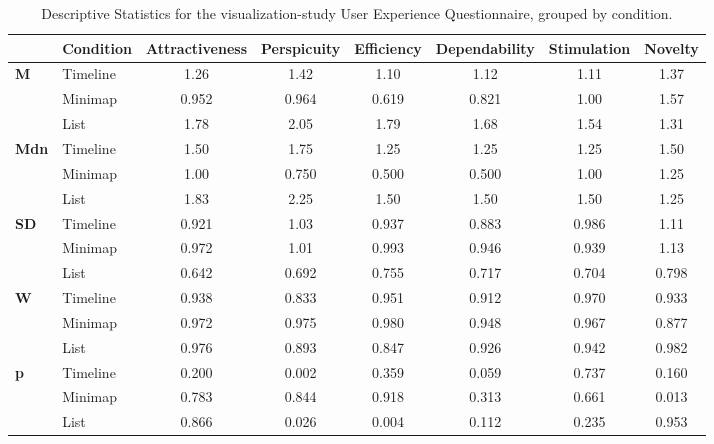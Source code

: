 \begin{table*}[ht]
    \centering
    \caption{Descriptive Statistics for the visualization-study User Experience Questionnaire, grouped by condition.}
    \begin{tabular}{llcccccc}
    \toprule
    \textbf{} & \textbf{Condition} & \textbf{Attractiveness} & \textbf{Perspicuity} & \textbf{Efficiency} & \textbf{Dependability} & \textbf{Stimulation} & \textbf{Novelty} \\
    \midrule
    \multirow{3}{*}{\textbf{M}} & Timeline & 1.26 & 1.42 & 1.10 & 1.12 & 1.11 & 1.37 \\
    & Minimap & 0.952 & 0.964 & 0.619 & 0.821 & 1.00 & 1.57 \\
    & List & 1.78 & 2.05 & 1.79 & 1.68 & 1.54 & 1.31 \\
    \midrule
    \multirow{3}{*}{\textbf{Mdn}} & Timeline & 1.50 & 1.75 & 1.25 & 1.25 & 1.25 & 1.50 \\
    & Minimap & 1.00 & 0.750 & 0.500 & 0.500 & 1.00 & 1.25 \\
    & List & 1.83 & 2.25 & 1.50 & 1.50 & 1.50 & 1.25 \\
    \midrule
    \multirow{3}{*}{\textbf{SD}} & Timeline & 0.921 & 1.03 & 0.937 & 0.883 & 0.986 & 1.11 \\
    & Minimap & 0.972 & 1.01 & 0.993 & 0.946 & 0.939 & 1.13 \\
    & List & 0.642 & 0.692 & 0.755 & 0.717 & 0.704 & 0.798 \\
    \midrule
    \multirow{3}{*}{\textbf{W}} & Timeline & 0.938 & 0.833 & 0.951 & 0.912 & 0.970 & 0.933 \\
    & Minimap & 0.972 & 0.975 & 0.980 & 0.948 & 0.967 & 0.877 \\
    & List & 0.976 & 0.893 & 0.847 & 0.926 & 0.942 & 0.982 \\
    \midrule
    \multirow{3}{*}{\textbf{p}} & Timeline & 0.200 & 0.002 & 0.359 & 0.059 & 0.737 & 0.160 \\
    & Minimap & 0.783 & 0.844 & 0.918 & 0.313 & 0.661 & 0.013 \\
    & List & 0.866 & 0.026 & 0.004 & 0.112 & 0.235 & 0.953 \\
    \bottomrule
    \end{tabular}
\end{table*}

